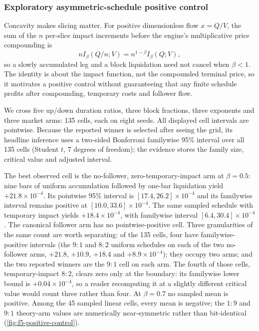 \subsubsection{Exploratory asymmetric-schedule positive control}\label{sec:f5-positive-control}

Concavity makes slicing matter. For positive dimensionless flow $x=Q/V$, the sum of the $n$ per-slice impact increments before the engine's multiplicative price compounding is
\[
n I_\beta(Q/n;V)=n^{1-\beta} I_\beta(Q;V),
\]
so a slowly accumulated leg and a block liquidation need not cancel when $\beta<1$. The identity is about the impact function, not the compounded terminal price, so it motivates a positive control without guaranteeing that any finite schedule profits after compounding, temporary costs and follower flow.

We cross five up/down duration ratios, three block fractions, three exponents and three market arms: 135 cells, each on eight seeds. All displayed cell intervals are pointwise. Because the reported winner is selected after seeing the grid, its headline inference uses a two-sided Bonferroni familywise 95\% interval over all 135 cells (Student $t$, 7 degrees of freedom); the evidence stores the family size, critical value and adjusted interval.

The best observed cell is the no-follower, zero-temporary-impact arm at $\beta=0.5$: nine bars of uniform accumulation followed by one-bar liquidation yield $+21.8\times10^{-4}$. Its pointwise 95\% interval is $[17.4,26.2]\times10^{-4}$ and its familywise interval remains positive at $[10.0,33.6]\times10^{-4}$. The same sampled schedule with temporary impact yields $+18.4\times10^{-4}$, with familywise interval $[6.4,30.4]\times10^{-4}$. The canonical follower arm has no pointwise-positive cell. Three granularities of the same count are worth separating: of the 135 cells, four have familywise-positive intervals (the $9{:}1$ and $8{:}2$ uniform schedules on each of the two no-follower arms, $+21.8$, $+10.9$, $+18.4$ and $+8.9\times10^{-4}$); they occupy two arms; and the two reported winners are the $9{:}1$ cell on each arm. The fourth of those cells, temporary-impact $8{:}2$, clears zero only at the boundary: its familywise lower bound is $+0.04\times10^{-4}$, so a reader recomputing it at a slightly different critical value would count three rather than four. At $\beta=0.7$ no sampled mean is positive. Among the 45 sampled linear cells, every mean is negative; the $1{:}9$ and $9{:}1$ theory-arm values are numerically near-symmetric rather than bit-identical (\cref{fig:f5-positive-control}).

